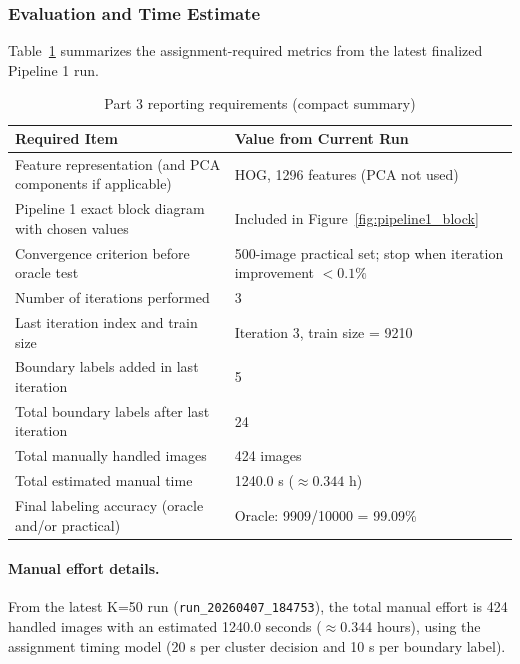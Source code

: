 \subsubsection{Evaluation and Time Estimate}
Table~\ref{tab:part3_requirements} summarizes the assignment-required metrics from the latest finalized Pipeline 1 run.
\begin{table}[H]
\centering
\caption{Part 3 reporting requirements (compact summary)}
\label{tab:part3_requirements}
\begin{tabular}{p{}p{}}
\toprule
\textbf{Required Item} & \textbf{Value from Current Run} \\
\midrule
Feature representation (and PCA components if applicable) & HOG, 1296 features (PCA not used) \\
Pipeline 1 exact block diagram with chosen values & Included in Figure~\ref{fig:pipeline1_block} \\
Convergence criterion before oracle test & 500-image practical set; stop when iteration improvement $< 0.1\%$ \\
Number of iterations performed & 3 \\
Last iteration index and train size & Iteration 3, train size = 9210 \\
Boundary labels added in last iteration & 5 \\
Total boundary labels after last iteration & 24 \\
Total manually handled images & 424 images \\
Total estimated manual time & 1240.0 s ($\approx 0.344$ h) \\
Final labeling accuracy (oracle and/or practical) & Oracle: 9909/10000 = 99.09\% \\
\bottomrule
\end{tabular}
\end{table}

\paragraph{Manual effort details.}
From the latest K=50 run (\texttt{run\_20260407\_184753}), the total manual effort is 424 handled images with an estimated 1240.0 seconds ($\approx 0.344$ hours), using the assignment timing model (20 s per cluster decision and 10 s per boundary label).

